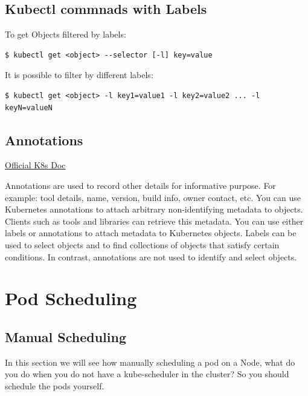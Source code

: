 \documentclass{article}
\newenvironment{codetemplate}[1][]{%
  \mybasecolorbox[#1]
  \itshape
}{%
  \endmybasecolorbox
}
\begin{document}
\subsection{Kubectl commnads with Labels}

To get Objects filtered by labels:
\begin{codetemplate}{}
\begin{verbatim}
$ kubectl get <object> --selector [-l] key=value
\end{verbatim}
\end{codetemplate}

It is possible to filter by different labels:
\begin{codetemplate}{}
\begin{verbatim}
$ kubectl get <object> -l key1=value1 -l key2=value2 ... -l keyN=valueN
\end{verbatim}
\end{codetemplate}

\subsection{Annotations}

\href{https://kubernetes.io/docs/concepts/overview/working-with-objects/annotations/}{Official K8s Doc}

Annotations are used to record other details for informative purpose. For example: tool details, name, version, build info, owner contact, etc. You can use Kubernetes annotations to attach arbitrary non-identifying metadata to objects. Clients such as tools and libraries can retrieve this metadata. You can use either labels or annotations to attach metadata to Kubernetes objects. Labels can be used to select objects and to find collections of objects that satisfy certain conditions. In contrast, annotations are not used to identify and select objects.

\newpage
\section{Pod Scheduling}

\subsection{Manual Scheduling}

In this section we will see how manually scheduling a pod on a Node, what do you do when you do not have a kube-scheduler in the cluster? So you should schedule the pods yourself.
\end{document}
